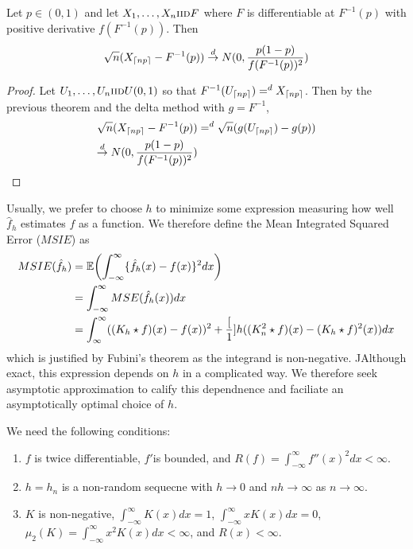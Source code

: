 \begin{thm}
  Let $p \in (0, 1)$ and let $X_{1}, \dots, X_{n} \textsc{iid} F$ where $F$ is
  differentiable at $F^{-1}(p)$ with positive derivative
  $f(F^{-1}(p))$.  Then
  \begin{align}
    \label{eq:141}
    \sqrt{n}(X_{\upperbound{np}} - F^{-1}(p)) \cd N(0, \frac{p(1-p)}{f(F^{-1}(p))^{2}} )
  \end{align}
\end{thm}

\begin{proof}
  Let $U_{1}, \dots, U_{n} \textsc{iid} U(0, 1)$ so that
  $F^{-1}(U_{\upperbound{np}}) =^{d} X_{\upperbound{np}}$.  Then by
  the previous theorem and the delta method with $g = F^{-1}$,
  \begin{align}
    \label{eq:142}
    \sqrt{n} (X_{\upperbound{np}} - F^{-1}(p)) &=^{d}
    \sqrt{n}(g(U_{\upperbound{np}}) - g(p)) \\
    \label{eq:143}
    \cd N(0, \frac{p(1-p)}{f(F^{-1}(p))^{2}} )
  \end{align}
\end{proof}

\begin{defn}
  Usually, we prefer to choose $h$ to minimize some expression measuring
how well $\hat f_{h}$ estimates $f$ as a function.  We therefore
define the Mean Integrated Squared Error ($MSIE$) as
\begin{align}
  \label{eq:14}
  MSIE(\hat f_{h}) &= \E{\int_{-\infty}^{\infty} \{ \hat f_{h}(x) -
    f(x) \}^{2} dx} \\
  &= \int_{-\infty}^{\infty} MSE(\hat f_{h}(x)) dx \\
  &= \int_{\infty}^{\infty} ((K_{h} \star f)(x) - f(x))^{2} +
  \frac[1]{h} ((K^{2}_{n} \star f)(x) - (K_{h} \star f)^{2}(x)) dx
\end{align} which is justified by Fubini's theorem as the integrand
is non-negative.
JAlthough exact, this expression depends on $h$ in a complicated way.
We therefore seek asymptotic approximation to calify this dependnence
and faciliate an asymptotically optimal choice of $h$.
\end{defn}

We need the following conditions:
\begin{enumerate}
\item \label{item:4} $f$ is twice differentiable, $f'$is bounded, and $R(f) =
  \int_{-\infty}^{\infty} f''(x)^{2} dx < \infty$.
\item \label{item:5} $h = h_{n}$ is a non-random sequecne with $h \rightarrow 0$ and
  $nh \rightarrow \infty$ as $n \rightarrow \infty$.
\item \label{item:6} $K$ is non-negative, $\int_{-\infty}^{\infty} K(x) dx = 1$,
  $\int_{-\infty}^{\infty} x K(x) dx = 0$, $\mu_{2}(K) =
  \int_{-\infty}^{\infty} x^{2} K(x) dx < \infty$, and $R(x) < \infty$.
\end{enumerate}

